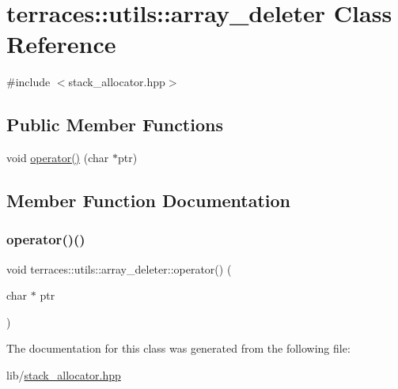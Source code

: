 \hypertarget{classterraces_1_1utils_1_1array__deleter}{}\section{terraces\+:\+:utils\+:\+:array\+\_\+deleter Class Reference}
\label{classterraces_1_1utils_1_1array__deleter}


{\ttfamily \#include $<$stack\+\_\+allocator.\+hpp$>$}

\subsection*{Public Member Functions}
\begin{DoxyCompactItemize}
\item 
void \hyperlink{classterraces_1_1utils_1_1array__deleter_abbef016d97dfca2f3c57095d50e0cea8}{operator()} (char $\ast$ptr)
\end{DoxyCompactItemize}


\subsection{Member Function Documentation}
\mbox{\label{classterraces_1_1utils_1_1array__deleter_abbef016d97dfca2f3c57095d50e0cea8}} 
\subsubsection{\texorpdfstring{operator()()}{operator()()}}
{\footnotesize\ttfamily void terraces\+::utils\+::array\+\_\+deleter\+::operator() (\begin{DoxyParamCaption}\item[{char $\ast$}]{ptr }\end{DoxyParamCaption})\hspace{0.3cm}{\ttfamily [inline]}}



The documentation for this class was generated from the following file\+:\begin{DoxyCompactItemize}
\item 
lib/\hyperlink{stack__allocator_8hpp}{stack\+\_\+allocator.\+hpp}\end{DoxyCompactItemize}
